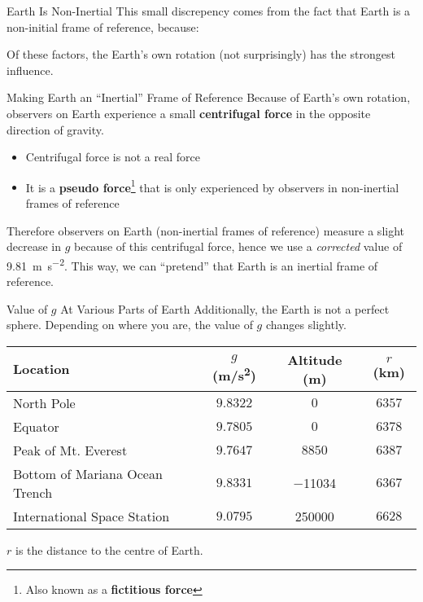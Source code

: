 \documentclass[12pt,compress,aspectratio=169]{beamer}
\begin{document}
\begin{frame}{Earth Is Non-Inertial}
  This small discrepency comes from the fact that Earth is a non-initial frame
  of reference, because:
  Of these factors, the Earth's own rotation (not surprisingly) has the
  strongest influence.
\end{frame}



\begin{frame}{Making Earth an ``Inertial'' Frame of Reference}
  Because of Earth's own rotation, observers on Earth experience a small
  \textbf{centrifugal force} in the opposite direction of gravity.
  \begin{itemize}
  \item Centrifugal force is not a real force
  \item It is a \textbf{pseudo force}\footnote{Also known as a
    \textbf{fictitious force}} that is only experienced by observers in
    non-inertial frames of reference
  \end{itemize}
  Therefore observers on Earth (non-inertial frames of reference)
  measure a slight
  decrease in $g$ because of this centrifugal force, hence we use a
  \emph{corrected} value of \SI{9.81}{\metre\per\second\squared}. This way, we
  can ``pretend'' that Earth is an inertial frame of reference.
\end{frame}



\begin{frame}{Value of $g$ At Various Parts of Earth}
  Additionally, the Earth is not a perfect sphere. Depending on where you are,
  the value of $g$ changes slightly.
  \begin{center}
    \begin{tabular}{l|c|c|c}
      \rowcolor{pink}
      \textbf{Location} & $g$ (\si{m/s^2}) & Altitude (\si{m}) & $r$ (\si{km})\\
      \hline
      North Pole                     & $9.8322$ & $0$      & $6357$ \\
      Equator                        & $9.7805$ & $0$      & $6378$ \\
      Peak of Mt. Everest            & $9.7647$ & $8850$   & $6387$ \\
      Bottom of Mariana Ocean Trench & $9.8331$ & \num{-11034} & $6367$ \\
      International Space Station    & $9.0795$ & \num{250000} & $6628$
    \end{tabular}
  \end{center}
  $r$ is the distance to the centre of Earth.
\end{frame}
\end{document}
